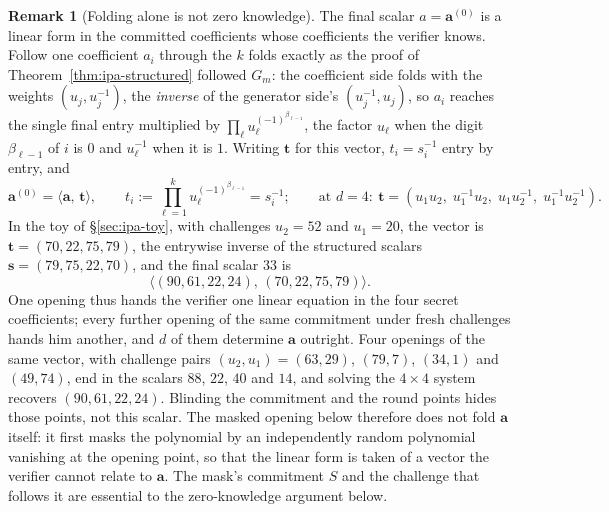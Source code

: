\documentclass[11pt,a4paper]{article}
\theoremstyle{definition}
\newtheorem{remark}[theorem]{Remark}
\newcommand{\ip}[2]{\langle #1,\, #2 \rangle}
\begin{document}
\begin{remark}[Folding alone is not zero knowledge]\label{rem:ipa-not-zk}
The final scalar $a = \mathbf a^{(0)}$ is a linear form in the
committed coefficients whose coefficients the verifier knows. Follow
one coefficient $a_i$ through the $k$ folds exactly as the proof of
Theorem~\ref{thm:ipa-structured} followed $G_m$: the coefficient side
folds with the weights $(u_j, u_j^{-1})$, the \emph{inverse} of the
generator side's $(u_j^{-1}, u_j)$, so $a_i$ reaches the single final
entry multiplied by $\prod_\ell u_\ell^{(-1)^{\beta_{\ell-1}}}$, the
factor $u_\ell$ when the digit $\beta_{\ell-1}$ of $i$ is $0$ and
$u_\ell^{-1}$ when it is $1$. Writing $\mathbf t$ for this vector,
$t_i = s_i^{-1}$ entry by entry, and
\begin{equation}\label{eq:ipa-linear-form}
\mathbf a^{(0)} = \ip{\mathbf a}{\mathbf t},
\qquad
t_i := \prod_{\ell=1}^{k} u_\ell^{(-1)^{\beta_{\ell-1}}} = s_i^{-1} ;
\qquad
\text{at } d = 4:\ \mathbf t = (u_1 u_2,\; u_1^{-1}u_2,\;
  u_1 u_2^{-1},\; u_1^{-1}u_2^{-1}).
\end{equation}
In the toy of \S\ref{sec:ipa-toy}, with challenges $u_2 = 52$ and
$u_1 = 20$, the vector is $\mathbf t = (70, 22, 75, 79)$, the entrywise
inverse of the structured scalars $\mathbf s = (79, 75, 22, 70)$, and the
final scalar $33$ is
\[
\ip{(90, 61, 22, 24)}{(70, 22, 75, 79)}.
\]
One opening thus
hands the verifier one linear equation in the four secret coefficients;
every further opening of the same commitment under fresh challenges
hands him another, and $d$ of them determine $\mathbf a$ outright.
Four openings of the same vector, with challenge pairs
$(u_2, u_1) = (63, 29)$, $(79, 7)$, $(34, 1)$ and $(49, 74)$, end in the
scalars $88$, $22$, $40$ and $14$, and solving the $4 \times 4$ system
recovers $(90, 61, 22, 24)$. Blinding the commitment and the round
points hides those points, not this scalar. The masked opening below
therefore does not fold $\mathbf a$ itself: it first masks the
polynomial by an independently random polynomial vanishing at the
opening point, so that the linear form is taken of a vector the verifier
cannot relate to $\mathbf a$. The mask's commitment $S$ and the
challenge that follows it are essential to the zero-knowledge argument
below.
\end{remark}
\end{document}
